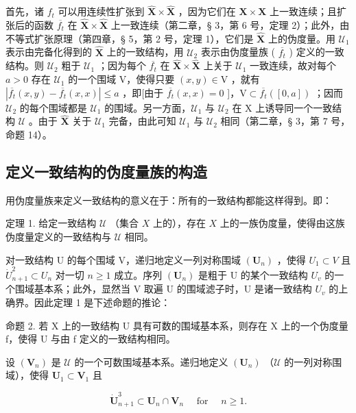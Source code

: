 首先，诸 \(f_{t}\) 可以用连续性扩张到 \(\hat{\mathbf{X}}\times\hat{\mathbf{X}}\) ，因为它们在 \(\mathbf{X}\times\mathbf{X}\) 上一致连续；且扩张后的函数 \(\overline{f_{t}}\) 在 \(\hat{\mathbf{X}}\times\hat{\mathbf{X}}\) 上一致连续（第二章，§ 3，第 6 号，定理 2）；此外，由不等式扩张原理（第四章，§ 5，第 2 号，定理 1），它们是 \(\hat{\mathbf{X}}\) 上的伪度量。用 \(\mathcal{U}_{1}\) 表示由完备化得到的 \(\hat{\mathbf{X}}\) 上的一致结构，用 \(\mathcal{U}_{2}\) 表示由伪度量族 ( \(\overline{f_{t}}\) ) 定义的一致结构。则 \(\mathcal{U}_{2}\) 粗于 \(\mathcal{U}_{1}\) ；因为每个 \(\overline{f_{t}}\) 在 \(\hat{\mathbf{X}}\times\hat{\mathbf{X}}\) 上关于 \(\mathcal{U}_{1}\) 一致连续，故对每个 \(a>0\) 存在 \(\mathcal{U}_{1}\) 的一个围域 V，使得只要 \((x,y)\in\mathrm{V}\) ，就有 \(|\overline{f_{t}}(x,y)-\overline{f_{t}}(x,x)|\leqslant a\) ，即{[}由于 \(\overline{f_{t}}(x,x)=0\) {]}，\(\mathrm{V}\subset\overline{f_{t}}([0,a])\) ；因而 \(\mathcal{U}_{2}\) 的每个围域都是 \(\mathcal{U}_{1}\) 的围域。另一方面，\(\mathcal{U}_{1}\) 与 \(\mathcal{U}_{2}\) 在 X 上诱导同一个一致结构 \(\mathcal{U}\) 。由于 \(\hat{\mathbf{X}}\) 关于 \(\mathcal{U}_{1}\) 完备，由此可知 \(\mathcal{U}_{1}\) 与 \(\mathcal{U}_{2}\) 相同（第二章，§ 3，第 7 号，命题 14）。

\subsection{定义一致结构的伪度量族的构造}

用伪度量族来定义一致结构的意义在于：所有的一致结构都能这样得到。即：

定理 1. 给定一致结构 \(\mathcal{U}\) （集合 \(X\) 上的），存在 \(X\) 上的一族伪度量，使得由这族伪度量定义的一致结构与 \(\mathcal{U}\) 相同。

对一致结构 U 的每个围域 V，递归地定义一列对称围域 \((\mathbf{U}_{n})\) ，使得 \(U_{1} \subset V\) 且 \(\dot{U}_{n+1}^{2} \subset U_{n}\) 对一切 \(n \geqslant 1\) 成立。序列 \((\mathbf{U}_{n})\) 是粗于 U 的某个一致结构 \(U_{v}\) 的一个围域基本系；此外，显然当 V 取遍 U 的围域滤子时，U 是诸一致结构 \(U_{v}\) 的上确界。因此定理 1 是下述命题的推论：

命题 2. 若 X 上的一致结构 U 具有可数的围域基本系，则存在 X 上的一个伪度量 f，使得 U 与由 f 定义的一致结构相同。

设 \((\mathbf{V}_n)\) 是 \(\mathcal{U}\) 的一个可数围域基本系。递归地定义 \((\mathbf{U}_n)\) （\(\mathcal{U}\) 的一列对称围域），使得 \(\mathbf{U}_1 \subset \mathbf{V}_1\) 且

\[
\mathbf {\dot {U}} _ {n + 1} ^ {3} \subset \mathbf {U} _ {n} \cap \mathbf {V} _ {n} \quad \text {   for   } \quad n \geqslant 1.
\]

